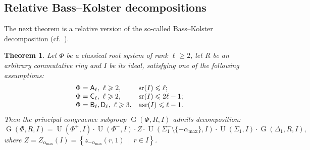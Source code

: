 \documentclass[11pt]{amsart}
\theoremstyle{plain}
\newtheorem{thm}{Theorem}
\numberwithin{equation}{section}
\numberwithin{lemma}{section}
\theoremstyle{definition}
\theoremstyle{remark}
\DeclareMathOperator{\G}{G}
\DeclareMathOperator{\U}{U}
\DeclareMathOperator{\sr}{sr}
\DeclareMathOperator{\asr}{asr}
\newcommand{\rA}{\mathsf{A}}
\newcommand{\rB}{\mathsf{B}}
\newcommand{\rC}{\mathsf{C}}
\newcommand{\rD}{\mathsf{D}}
\begin{document}
\subsection{Relative Bass--Kolster decompositions}\label{sec:bass-kolster}
The next theorem is a relative version of the so-called Bass--Kolster decomposition (cf.~\cite[Theorem~2.1]{St78}).
\begin{thm}\label{thm:BassKolster}
Let $\Phi$ be a classical root system of rank $\ell\geqslant2$, let $R$ be an arbitrary commutative ring and $I$ be its ideal, satisfying one of the following assumptions:
\[\begin{array}{l@{\quad}l@{\quad}l@{\quad}c}
\Phi = \rA_\ell, \ \ell\geqslant 2, & \sr(I) \leqslant \ell; \\
\Phi = \rC_\ell, \ \ell\geqslant 2, & \sr(I) \leqslant 2\ell-1; \\
\Phi = \rB_\ell, \rD_\ell, \ \ell\geqslant 3, & \asr(I) \leqslant \ell-1.
\end{array}\]
Then the principal congruence subgroup $\G(\Phi, R, I)$ admits decomposition:
\[ \G(\Phi, R, I)=  \U(\Phi^+, I) \cdot \U(\Phi^-, I) \cdot Z \cdot \U(\Sigma_1^-\setminus\{-\alpha_{\max}\}, I) \cdot \U(\Sigma_1, I) \cdot \G(\Delta_1, R, I), \]
where $Z = Z_{\alpha_{\max}}(I)=\left\{z_{-\alpha_{\max}}(r, 1)\ \middle|\ r\in I \right\}$.
\end{thm}
\end{document}
